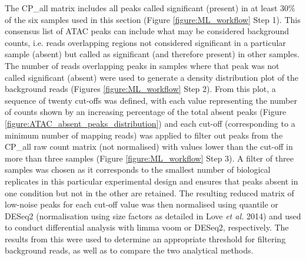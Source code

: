 The CP\_all matrix includes all peaks called significant (present) in at least 30\% of the six samples used in this section (Figure \ref{figure:ML_workflow} Step 1). This consensus list of ATAC peaks can include what may be considered background counts, i.e. reads overlapping regions not considered significant in a particular sample (absent) but called as significant (and therefore present) in other samples. The number of reads overlapping peaks in samples where that peak was not called significant (absent) were used to generate a density distribution plot of the background reads (Figures \ref{figure:ML_workflow} Step 2). From this plot, a sequence of twenty cut-offs was defined, with each value representing the number of counts shown by an increasing percentage of the total absent peaks (Figure \ref{figure:ATAC_absent_peaks_distribution}) and each cut-off (corresponding to a minimum number of mapping reads) was applied to filter out peaks from the CP\_all raw count matrix (not normalised) with values lower than the cut-off in more than three samples (Figure \ref{figure:ML_workflow} Step 3). A filter of three samples was chosen as it corresponds to the smallest number of biological replicates in this particular experimental design and ensures that peaks absent in one condition but not in the other are retained. The resulting reduced matrix of low-noise peaks for each cut-off value was then normalised using quantile or DESeq2 (normalisation using size factors as detailed in Love \textit{et al.} 2014) and used to conduct differential analysis with limma voom or DESeq2, respectively. The results from this were used to determine an appropriate threshold for filtering background reads, as well as to compare the two analytical methods. 


